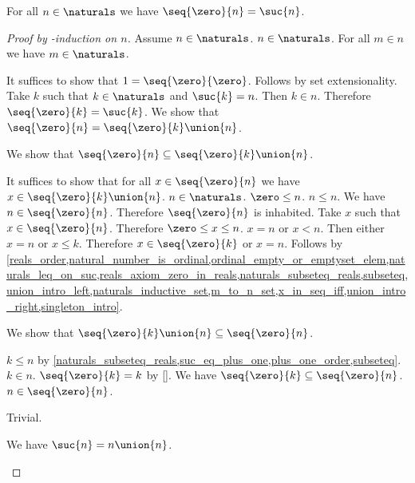 \begin{proposition}\label{seq_zero_to_n_eq_to_suc_n}
    For all $n \in \naturals$ we have $\seq{\zero}{n} = \suc{n}$.
\end{proposition}
\begin{proof} [Proof by \in-induction on $n$]
    Assume $n \in \naturals$.
    $n \in \naturals$.
    For all $m \in n$ we have $m \in \naturals$.
    \begin{byCase}
            It suffices to show that $1 = \seq{\zero}{\zero}$.
            Follows by set extensionality.
            Take $k$ such that $k \in \naturals$ and $\suc{k} = n$.
            Then $k \in n$.
            Therefore $\seq{\zero}{k} = \suc{k}$.
            We show that $\seq{\zero}{n} = \seq{\zero}{k} \union \{n\}$.
            \begin{subproof}
                We show that $\seq{\zero}{n} \subseteq \seq{\zero}{k} \union \{n\}$.
                \begin{subproof}
                    It suffices to show that for all $x \in \seq{\zero}{n}$ we have $x \in \seq{\zero}{k} \union \{n\}$.
                    $n \in \naturals$.
                    $\zero \leq n$.
                    $n \leq n$.
                    We have $n \in \seq{\zero}{n}$.
                    Therefore $\seq{\zero}{n}$ is inhabited.
                    Take $x$ such that $x \in \seq{\zero}{n}$.
                    Therefore $\zero \leq x \leq n$.
                    $x = n$ or $x < n$.
                    Then either $x = n$ or $x \leq k$.
                    Therefore $x \in \seq{\zero}{k}$ or $x = n$.
                    Follows by \cref{reals_order,natural_number_is_ordinal,ordinal_empty_or_emptyset_elem,naturals_leq_on_suc,reals_axiom_zero_in_reals,naturals_subseteq_reals,subseteq,union_intro_left,naturals_inductive_set,m_to_n_set,x_in_seq_iff,union_intro_right,singleton_intro}.
                \end{subproof}
                We show that $\seq{\zero}{k} \union \{n\} \subseteq \seq{\zero}{n}$.
                \begin{subproof}
                    $k \leq n$ by \cref{naturals_subseteq_reals,suc_eq_plus_one,plus_one_order,subseteq}.
                    $k \in n$.
                    $\seq{\zero}{k} = k$ by \cref{}.
                    We have $\seq{\zero}{k} \subseteq \seq{\zero}{n}$.
                    $n \in \seq{\zero}{n}$.
                \end{subproof}
                Trivial.
            \end{subproof}
            We have $\suc{n} = n \union \{n\}$.
    \end{byCase}


\end{proof}
